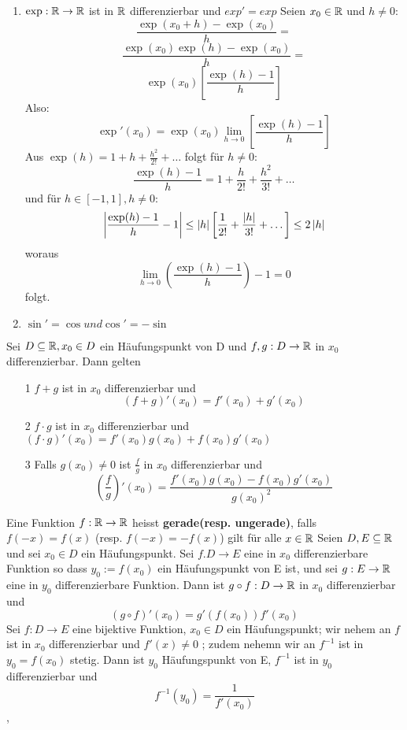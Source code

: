 \begin{enumerate}
    \item \( \exp : \mathbb{R} \rightarrow \mathbb{R} \) ist in \( \mathbb{R}\) differenzierbar und \(exp' = exp\)
    Seien \(x_0 \in \mathbb{R}\) und \( h \neq 0:\)
    \[\frac{\exp(x_0 + h)-\exp(x_0)}{h} = \] \newline
    \[\frac{\exp(x_0)\exp(h)-\exp(x_0)}{h} = \] \newline
    \[\exp(x_0) \left[ \frac{\exp(h)-1}{h}\right]\]
    Also: \[ \exp'(x_0) = \exp(x_0) \lim_{h \rightarrow 0} \left[ \frac{\exp(h) - 1}{h}\right]\]
    Aus \( \exp(h) = 1 + h + \frac{h^2}{2!}+ \dots \) folgt für \( h \neq 0\):
    \[\frac{\exp(h) - 1}{h} = 1 + \frac{h}{2!} + \frac{h^2}{3!} + \dots\]
    und für \( h \in [-1,1], h \neq 0\):
    \[ \left\lvert \frac{\exp(h) - 1}{h}-1 \right\rvert \leq \left\lvert h \right\rvert \left[ \frac{1}{2!} + \frac{\left\lvert h \right\rvert}{3!} + \dots \right] \leq 2\left\lvert h \right\rvert\]
    woraus
    \[ \lim_{h \rightarrow 0} \left( \frac{\exp(h) - 1}{h}\right) - 1 = 0\]
    folgt.
    \item \(\sin' = \cos und \cos' = -\sin\)
\end{enumerate}
\Satz[4.9] Sei \(D \subseteq \mathbb{R}, x_0 \in D\) ein Häufungspunkt von D und \(f,g : D \rightarrow \mathbb{R} \) in \(x_0\) differenzierbar. Dann gelten
\begin{enumerate}
    \item [1] \(f + g\) ist in \(x_0 \) differenzierbar und
    \[(f + g)'(x_0) = f'(x_0) + g'(x_0)\]
    \item [2] \(f \cdot g\) ist in \(x_0\) differenzierbar und
    \( (f \cdot g)'(x_0) = f'(x_0)g(x_0) + f(x_0)g'(x_0)\)
    \item [3] Falls \(g(x_0) \neq 0 \) ist \( \frac{f}{g}\) in \(x_0\) differenzierbar und
    \[ \left(\frac{f}{g}\right)'(x_0) = \frac{f'(x_0)g(x_0) - f(x_0)g'(x_0)}{g(x_0)^2}\]
\end{enumerate}
\Def{} Eine Funktion \(f: \mathbb{R} \rightarrow \mathbb{R} \) heisst \newline \textbf{gerade(resp. ungerade)}, falls \( f(-x) = f(x)\) \newline (resp. \(f(-x) = -f(x)\)) gilt für alle \( x \in \mathbb{R}\) \newline
{} Seien \(D,E \subseteq \mathbb{R}\) und sei \(x_0 \in D\) ein Häufungspunkt. Sei \(f. D \rightarrow E\) eine in \(x_0\) differenzierbare Funktion so dass \(y_0 := f(x_0)\) ein Häufungspunkt von E ist, und sei \(g : E \rightarrow \mathbb{R} \) eine in \(y_0\) differenzierbare Funktion. Dann ist \(g \circ f : D \rightarrow \mathbb{R} \) in \(x_0\) differenzierbar und
\[ (g \circ f)'(x_0) = g'(f(x_0))f'(x_0)\]
 Sei \(f : D \rightarrow E \) eine bijektive Funktion, \(x_0 \in D\) ein Häufungspunkt; wir nehem an \(f\) ist in \(x_0\) differenzierbar und \(f'(x) \neq 0\) ; zudem nehemn wir an \(f^{-1}\) ist in \(y_0 = f(x_0)\) stetig. Dann ist \(y_0\) Häufungspunkt von E, \(f^{-1}\) ist in \(y_0\) differenzierbar und
\[f^{-1}(y_0) = \frac{1}{f'(x_0)}\]
\sep
